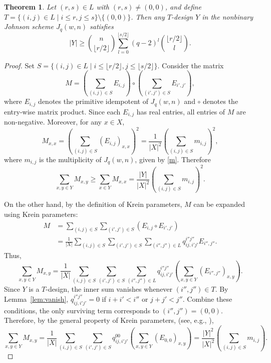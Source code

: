 \documentclass[a4paper, 11pt]{article}
\newtheorem{theorem}{Theorem}[section]
\theoremstyle{definition}
\begin{document}
\begin{theorem}\label{thm:Fisher}
Let $(r,s) \in L$ with $(r,s) \neq (0,0)$, and define $T = \{(i,j) \in L \mid i \le r, j \le s\} \setminus \{(0,0)\}$.
Then any $T$-design $Y$ in the nonbinary Johnson scheme $J_q(w, n)$ satisfies
\[
|Y| \ge \binom{n}{\lfloor r / 2 \rfloor} \sum_{l = 0}^{\lfloor s / 2 \rfloor} (q-2)^l \binom{\lfloor r / 2 \rfloor}{l}.
\]
\end{theorem}
\begin{proof}
Set $S = \{(i,j) \in L \mid i \le \lfloor r / 2 \rfloor, j \le \lfloor s / 2 \rfloor\}$.
Consider the matrix
\[
M = \left(\sum_{(i,j) \in S} E_{i,j}\right) \circ \left(\sum_{(i',j') \in S} E_{i',j'}\right),
\]
where $E_{i,j}$ denotes the primitive idempotent of $J_q(w, n)$ and $\circ$ denotes the entry-wise matrix product.
Since each $E_{i,j}$ has real entries, all entries of $M$ are non-negative.
Moreover, for any $x \in X$,
\[
M_{x,x} = \left(\sum_{(i,j) \in S} (E_{i,j})_{x,x} \right)^2 = \frac{1}{|X|^2}\left(\sum_{(i,j) \in S} m_{i,j} \right)^2,
\]
where $m_{i,j}$ is the multiplicity of $J_q(w, n)$, given by \eqref{m}.
Therefore 
\begin{equation}\label{M1}
\sum_{x,y \in Y} M_{x,y} \ge \sum_{x \in Y} M_{x,x} = \frac{|Y|}{|X|^2}\left(\sum_{(i,j) \in S} m_{i,j} \right)^2.
\end{equation}

On the other hand, by the definition of Krein parameters, $M$ can be expanded using Krein parameters:
\begin{align*}
M &= \sum_{(i,j) \in S} \sum_{(i',j') \in S} \left(E_{i,j} \circ E_{i',j'}\right) \\
&= \frac{1}{|X|}\sum_{(i,j) \in S} \sum_{(i',j') \in S} \sum_{(i'',j'') \in L} q_{ij,i'j'}^{i''j''} E_{i'',j''}.
\end{align*}
Thus,
\[
\sum_{x,y \in Y} M_{x,y} = \frac{1}{|X|}\sum_{(i,j) \in S} \sum_{(i',j') \in S} \sum_{(i'',j'') \in L} q_{ij,i'j'}^{i''j''} \left( \sum_{x,y \in Y} (E_{i'',j''})_{x,y}\right).
\]
Since $Y$ is a $T$-design, the inner sum vanishes whenever $(i'',j'') \in T$.
By Lemma~\ref{lem:vanish}, $q_{ij,i'j'}^{i''j''} = 0$ if $i+i' < i''$ or $j+j' < j''$.
Combine these conditions,
the only surviving term corresponds to $(i'',j'') = (0,0)$.
Therefore, by the general property of Krein parameters,
(see, e.g., \cite[Proposition~2.24\,(3)]{BBIT21}), 
\begin{equation}\label{M2}
\sum_{x,y \in Y} M_{x,y} = \frac{1}{|X|}\sum_{(i,j) \in S} \sum_{(i',j') \in S} q_{ij,i'j'}^{00} \left( \sum_{x,y \in Y} (E_{0,0})_{x,y}\right)
= \frac{|Y|^2}{|X|^2}\left(\sum_{(i,j) \in S} m_{i,j} \right).
\end{equation}


\end{proof}
\end{document}
